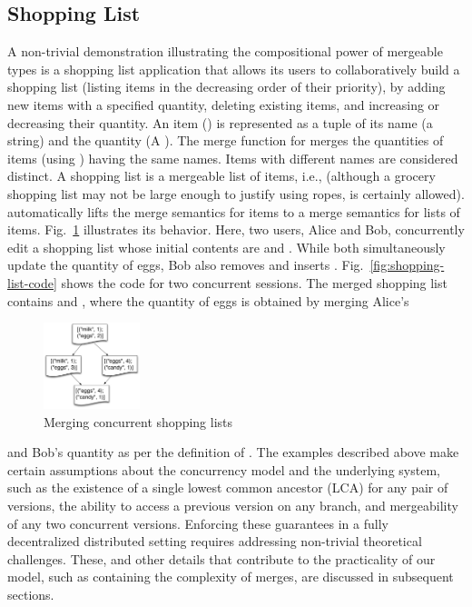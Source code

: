 \subsection{Shopping List}

A non-trivial demonstration illustrating the compositional power of
mergeable types is a shopping list application that allows its users
to collaboratively build a shopping list (listing items in the
decreasing order of their priority), by adding new items with a
specified quantity, deleting existing items, and increasing or
decreasing their quantity. An item () is represented as a
tuple of its name (a string) and the quantity (A ).  The
merge function for  merges the quantities of items (using
) having the same names. Items with different names are
considered distinct. A shopping list is a mergeable list of items,
i.e.,  (although a grocery shopping list may not be
large enough to justify using ropes,  is
certainly allowed).   automatically lifts the
merge semantics for items to a merge semantics for lists of items.
Fig.~\ref{fig:shopping-list} illustrates its behavior.  Here, two
users, Alice and Bob, concurrently edit a shopping list whose initial
contents are  and . While both simultaneously update
the quantity of eggs, Bob also removes  and inserts .
Fig.~\ref{fig:shopping-list-code} shows the \name code for two
concurrent sessions. The merged shopping list contains  and
, where the quantity of eggs is obtained by merging Alice's
\begin{figure}
  \centering
  \includegraphics[width=0.25\textwidth]{Figures/shopping-list}
  \caption{Merging concurrent shopping lists}
  \label{fig:shopping-list}
  \vspace*{.25in}
\end{figure}
and Bob's quantity as per the definition of .
The examples described above make certain assumptions about the
concurrency model and the underlying system, such as the existence of
a single lowest common ancestor (LCA) for any pair of versions, the
ability to access a previous version on any branch, and mergeability
of any two concurrent versions. Enforcing these guarantees in a fully
decentralized distributed setting requires addressing non-trivial
theoretical challenges. These, and other details that contribute to
the practicality of our model, such as containing the complexity of
merges, are discussed in subsequent sections.


